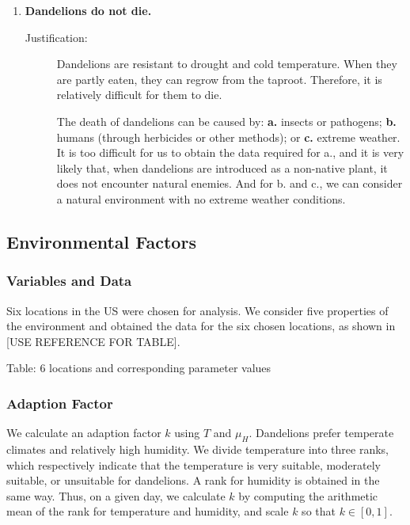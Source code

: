 \documentclass[12pt]{article}
\begin{document}
\begin{enumerate}
			\item \textbf{Dandelions do not die.}
			\vspace{-0.125in}
			\begin{description}
				\item[Justification:] Dandelions are resistant to drought and cold temperature.  When they are partly eaten, they can regrow from the taproot.  Therefore, it is relatively difficult for them to die.
				
				The death of dandelions can be caused by: \textbf{a.} insects or pathogens; \textbf{b.} humans (through herbicides or other methods); or \textbf{c.} extreme weather.  It is too difficult for us to obtain the data required for a., and it is very likely that, when dandelions are introduced as a non-native plant, it does not encounter natural enemies.  And for b. and c., we can consider a natural environment with no extreme weather conditions.  
			\end{description}
			
		\end{enumerate}
	
	\subsection{Environmental Factors}
	
		\subsubsection{Variables and Data}
		
			Six locations in the US were chosen for analysis.  We consider five properties of the environment and obtained the data for the six chosen locations, as shown in [USE REFERENCE FOR TABLE].  
			
			Table: 6 locations and corresponding parameter values
		
		\subsubsection{Adaption Factor}
		
			We calculate an adaption factor $k$ using $T$ and $\mu_H$.  Dandelions prefer temperate climates and relatively high humidity.  We divide temperature into three ranks, which respectively indicate that the temperature is very suitable, moderately suitable, or unsuitable for dandelions.  A rank for humidity is obtained in the same way.  Thus, on a given day, we calculate $k$ by computing the arithmetic mean of the rank for temperature and humidity, and scale $k$ so that $k \in [0, 1]$.
		
\end{document}
